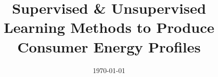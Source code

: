 \documentclass[a4paper, 12pt, oneside]{Thesis}  %
\begin{document}
\frontmatter      %

\title  {Supervised \& Unsupervised Learning Methods to Produce Consumer Energy Profiles}

\addresses  {\groupname\\\deptname\\\univname}  %
\date       {\today}
\subject    {}
\keywords   {}

\maketitle


\fancyhead{}  %
\rhead{\thepage}  %
\lhead{}  %

\pagestyle{fancy}  %
\end{document}
